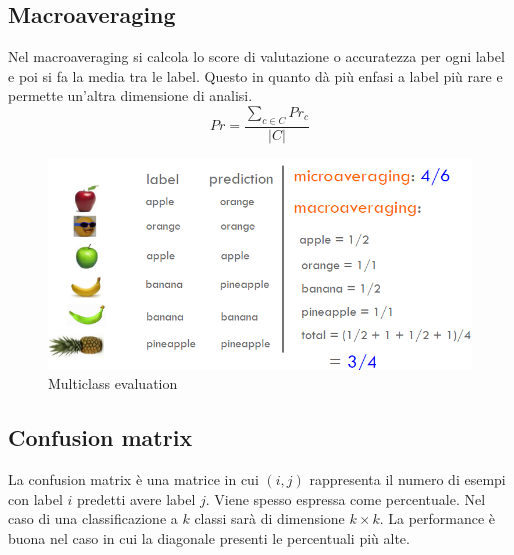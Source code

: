 	\subsection{Macroaveraging}
	Nel macroaveraging si calcola lo score di valutazione o accuratezza per ogni label e poi si fa la media tra le label.
	Questo in quanto d\`a pi\`u enfasi a label pi\`u rare e permette un'altra dimensione di analisi.
	$$Pr=\dfrac{\sum\limits_{c\in C}Pr_c}{|C|}$$
	
	\begin{figure}
		\centering
		\includegraphics[width=0.6\linewidth]{imgs/chapter6/img4}
		\caption{Multiclass evaluation}
		\label{fig:chapter06-04}
	\end{figure}

	\subsection{Confusion matrix}
	La confusion matrix \`e una matrice in cui $(i, j)$ rappresenta il numero di esempi con label $i$ predetti avere label $j$.
	Viene spesso espressa come percentuale.
	Nel caso di una classificazione a $k$ classi sar\`a di dimensione $k\times k$.
	La performance \`e buona nel caso in cui la diagonale presenti le percentuali pi\`u alte.
